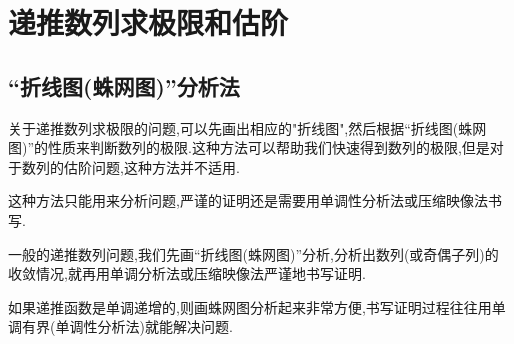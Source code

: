 \documentclass[../../main.tex]{subfiles}
\begin{document}
\section{递推数列求极限和估阶}


\subsection{“折线图(蛛网图)”分析法}
关于递推数列求极限的问题,可以先画出相应的"折线图",然后根据“折线图(蛛网图)”的性质来判断数列的极限.这种方法可以帮助我们快速得到数列的极限,但是对于数列的估阶问题,这种方法并不适用.

\begin{remark}
这种方法只能用来分析问题,严谨的证明还是需要用单调性分析法或压缩映像法书写.

一般的递推数列问题,我们先画“折线图(蛛网图)”分析,分析出数列(或奇偶子列)的收敛情况,就再用单调分析法或压缩映像法严谨地书写证明.

如果递推函数是单调递增的,则画蛛网图分析起来非常方便,书写证明过程往往用单调有界(单调性分析法)就能解决问题.
\end{remark}
\end{document}
